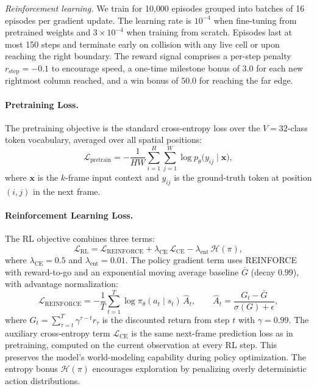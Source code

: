 \textit{Reinforcement learning.}
We train for 10{,}000 episodes grouped into batches of 16 episodes per gradient update.
The learning rate is $10^{-4}$ when fine-tuning from pretrained weights and $3 \times 10^{-4}$ when training from scratch.
Episodes last at most 150 steps and terminate early on collision with any live cell or upon reaching the right boundary.
The reward signal comprises a per-step penalty $r_{\text{step}} = -0.1$ to encourage speed, a one-time milestone bonus of $3.0$ for each new rightmost column reached, and a win bonus of $50.0$ for reaching the far edge.

\paragraph{Pretraining Loss.}
The pretraining objective is the standard cross-entropy loss over the $V = 32$-class token vocabulary, averaged over all spatial positions:
\begin{equation}
    \mathcal{L}_{\text{pretrain}} = - \frac{1}{HW} \sum_{i=1}^{H} \sum_{j=1}^{W} \log p_\theta\!\bigl(y_{ij} \mid \mathbf{x}\bigr),
\end{equation}
where $\mathbf{x}$ is the $k$-frame input context and $y_{ij}$ is the ground-truth token at position $(i,j)$ in the next frame.

\paragraph{Reinforcement Learning Loss.}
The RL objective combines three terms:
\begin{equation}
    \mathcal{L}_{\text{RL}} = \mathcal{L}_{\text{REINFORCE}} + \lambda_{\text{CE}}\,\mathcal{L}_{\text{CE}} - \lambda_{\text{ent}}\,\mathcal{H}(\pi),
\end{equation}
where $\lambda_{\text{CE}} = 0.5$ and $\lambda_{\text{ent}} = 0.01$.
The policy gradient term uses REINFORCE with reward-to-go and an exponential moving average baseline $\bar{G}$ (decay $0.99$), with advantage normalization:
\begin{equation}
    \mathcal{L}_{\text{REINFORCE}} = -\frac{1}{T}\sum_{t=1}^{T} \log \pi_\theta(a_t \mid s_t)\,\hat{A}_t, \qquad \hat{A}_t = \frac{G_t - \bar{G}}{\sigma(G) + \epsilon},
\end{equation}
where $G_t = \sum_{\tau=t}^{T} \gamma^{\tau - t} r_\tau$ is the discounted return from step $t$ with $\gamma = 0.99$.
The auxiliary cross-entropy term $\mathcal{L}_{\text{CE}}$ is the same next-frame prediction loss as in pretraining, computed on the current observation at every RL step. This preserves the model's world-modeling capability during policy optimization.
The entropy bonus $\mathcal{H}(\pi)$ encourages exploration by penalizing overly deterministic action distributions.